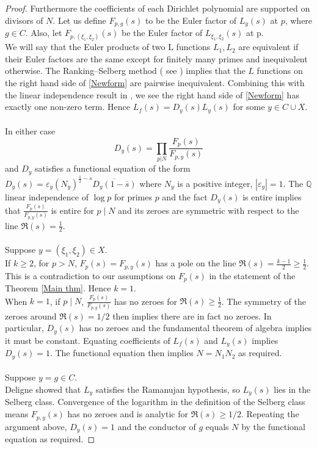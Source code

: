 \documentclass[a4paper,12.5pt]{amsart}
\theoremstyle{definition}
\theoremstyle{remark}
\begin{document}
\begin{proof}
                Furthermore the coefficients of each Dirichlet polynomial are supported on divisors of $N$.   Let us define $F_{p,g}(s)$ to be the Euler factor of $L_g(s)$ at $p$, where $g \in  C$. Also, let $F_{p, (\xi_1, \xi_2)} (s)$ be the Euler factor of $L_{\xi_1, \xi_2} (s) $ at p.\\
                   We will say that the Euler products of two L functions $L_1, L_2$  are equivalent if their Euler factors are the same except for finitely many primes and inequivalent otherwise.  The Ranking--Selberg method  ( see \cite[Corollay~4.4]{booker2016converse}) implies that the $L$ functions on the right hand side of \eqref{Newform} are pairwise inequivalent. Combining this with the linear independence result in \cite[Theorem~2]{kaczorowski1999linear}, we see the right hand side of \eqref{Newform} has exactly one non-zero term. Hence $L_f(s)= D_{y}(s) L_{y}(s)$ for some $y \in C \cup X$. \\ \\
                 In either case 
                 \[ D_{y} (s) = \prod_{p|N} \frac{F_p(s)}{ F_{p,y} (s)}                  \]
                and $D_y$ satisfies a functional equation of the form 
                 $  D_y(s) = \varepsilon_y  (N_{y})^{\frac{1}{2}-s} \overline{D_y ( 1- \overline{s})} $ where $N_y$ is a positive integer, $ |\varepsilon_y|=1.$ The $\mathbb{Q}$ linear independence of $\log p$ for primes $p$ and the fact $D_{y}(s)$ is entire implies that $ \frac{F_p(s)}{F_{p,y}(s)}$ is entire for $p \mid N$ and its zeroes are symmetric with respect to the line $\Re(s)= \frac{1}{2}$.  \\ \\
                  Suppose $ y=(\xi_1, \xi_2) \in X$. \\ 
                  If $k 
                 \geq 2$, for $p>N$, $F_p(s) =  F_{p,y}(s)    $  has a pole on the line 
                 $ \Re(s) =  \frac{k-1}{2} \geq \frac{1}{2}$.  This is a contradiction to our assumptions on $F_p(s)$ in the statement of the Theorem \ref{Main thm}. Hence $k=1$. \\
                 When $k=1$, if  $p \mid N$,  $\frac{F_p(s)}{F_{p,y}(s)}$ has no zeroes for $\Re(s) \geq \frac{1}{2}$. The symmetry of the zeroes around $\Re(s)=1/2$ then implies there are in fact no zeroes.  In particular, $D_y(s)$ has no zeroes and the fundamental theorem of algebra implies it must be constant. Equating coefficients of $L_f(s)$ and $L_y(s)$  implies $D_y(s)=1$. The functional equation then implies $N=N_1N_2$ as required.  \\  \\
                  Suppose $y=g \in C$. \\
                 Deligne showed that $L_y$ satisfies the Ramanujan hypothesis, so $ L_y(s)$ lies in the Selberg class. Convergence of the logarithm in the definition of the Selberg class means  $F_{p,y} (s) $ has no zeroes and is analytic for $\Re(s) \geq 1/2$. Repeating the argument above, $D_y(s)=1$ and the conductor of $g$ equals $N$ by the functional equation as required. 
                 
                 \end{proof}
\end{document}
